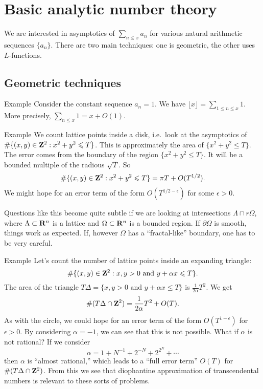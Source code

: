 
\section{Basic analytic number theory}





We are interested in asymptotics of $\sum_{n\leqslant x} a_n$ for various 
natural arithmetic sequences $\{a_n\}$. There are two main techniques: one is 
geometric, the other uses $L$-functions. 





\subsection{Geometric techniques}

\begin{enonce}[remark]{Example}
Consider the constant sequence $a_n=1$. We have 
$\lfloor x\rfloor = \sum_{1\leqslant n \leqslant x} 1$. More precisely, 
$\sum_{n\leqslant x} 1 = x+O(1)$. 
\end{enonce}

\begin{enonce}[remark]{Example}
We count lattice points inside a disk, i.e.~look at the asymptotics of 
$\#\{(x,y)\in \mathbf{Z}^2:x^2+y^2\leqslant T\}$. This is approximately the area of 
$\{x^2+y^2\leqslant T\}$. The error comes from the boundary of the region 
$\{x^2+y^2\leqslant T\}$. It will be a bounded multiple of the radious 
$\sqrt T$. So 
\[
  \#\{(x,y)\in \mathbf{Z}^2:x^2+y^2\leqslant T\} = \pi T + O(T^{1/2}) . 
\]
We might hope for an error term of the form $O(T^{1/2-\epsilon})$ for some 
$\epsilon>0$. 
\end{enonce}

Questions like this become quite subtle if we are looking at intersections 
$\Lambda\cap r\Omega$, where $\Lambda\subset \mathbf{R}^n$ is a lattice and 
$\Omega\subset \mathbf{R}^n$ is a bounded region. If $\partial\Omega$ is smooth, 
things work as expected. If, however $\Omega$ has a ``fractal-like'' boundary, 
one has to be very careful. 

\begin{enonce}[remark]{Example}
Let's count the number of lattice points inside an expanding triangle: 
\[
  \#\{(x,y)\in \mathbf{Z}^2:x,y>0\text{ and }y+\alpha x\leqslant T\} .
\]
The area of the triangle 
$T\Delta = \{x,y>0\text{ and }y+\alpha x\leqslant T\}$ is 
$\frac{1}{2\alpha}T^2$. We get 
\[
  \#(T\Delta\cap \mathbf{Z}^2) = \frac{1}{2\alpha} T^2 + O(T) .
\]
As with the circle, we could hope for an error term of the form 
$O(T^{1-\epsilon})$ for $\epsilon>0$. By considering $\alpha=-1$, we can see 
that this is not possible. What if $\alpha$ is not rational? If we 
consider 
\[
  \alpha = 1+N^{-1} + 2^{-N} + 2^{2^N} + \cdots
\]
then $\alpha$ is ``almost rational,'' which leads to a ``full error term'' 
$O(T)$ for $\# (T\Delta\cap \mathbf{Z}^2)$. From this we see that diophantine 
approximation of transcendental numbers is relevant to these sorts of 
problems. 
\end{enonce}

